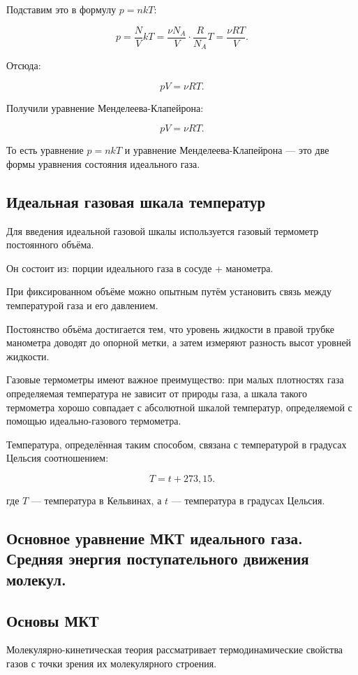 \documentclass[a4paper,12pt]{article}
\begin{document}
Подставим это в формулу $p=nkT$:

\[
p=\frac{N}{V}kT=\frac{\nu N_A}{V}\cdot\frac{R}{N_A}T=\frac{\nu RT}{V}.
\]

Отсюда:

\[
pV=\nu RT.
\]

Получили уравнение Менделеева-Клапейрона:

\[
pV=\nu RT.
\]

То есть уравнение $p=nkT$ и уравнение Менделеева-Клапейрона — это две формы уравнения состояния идеального газа.

\subsection*{Идеальная газовая шкала температур}

Для введения идеальной газовой шкалы используется газовый термометр постоянного объёма.

Он состоит из: порции идеального газа в сосуде + манометра.

При фиксированном объёме можно опытным путём установить связь между температурой газа и его давлением.

Постоянство объёма достигается тем, что уровень жидкости в правой трубке манометра доводят до опорной метки, а затем измеряют разность высот уровней жидкости.

Газовые термометры имеют важное преимущество: при малых плотностях газа определяемая температура не зависит от природы газа, а шкала такого термометра хорошо совпадает с абсолютной шкалой температур, определяемой с помощью идеально-газового термометра.

Температура, определённая таким способом, связана с температурой в градусах Цельсия соотношением:

\[
T=t+273{,}15.
\]

где $T$ — температура в Кельвинах, а $t$ — температура в градусах Цельсия.

\subsection{Основное уравнение МКТ идеального газа. Средняя энергия поступательного движения молекул.}

\subsection*{Основы МКТ}

Молекулярно-кинетическая теория рассматривает термодинамические свойства газов с точки зрения их молекулярного строения.
\end{document}
